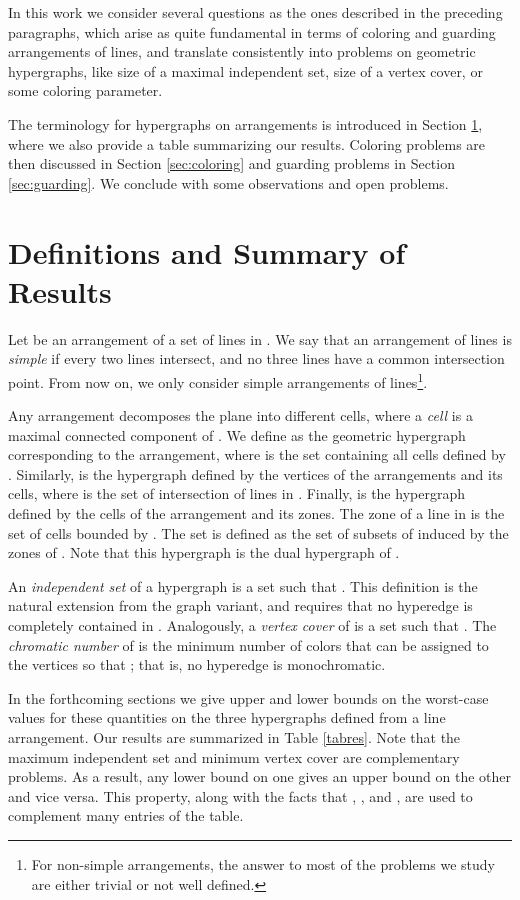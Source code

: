 \documentclass[11pt,a4paper]{article}
\begin{document}
In this work we consider several questions as the ones described in the preceding paragraphs, which arise as quite fundamental in terms of coloring and guarding arrangements of lines, and translate consistently into problems on geometric hypergraphs,  like size of a maximal independent set, size of a vertex cover, or some coloring parameter.

The terminology for hypergraphs on arrangements is introduced in Section \ref{sec:definitions}, where we also provide a table summarizing our results. Coloring problems are then discussed in Section \ref{sec:coloring} and guarding problems in Section \ref{sec:guarding}. We conclude with some observations and open problems.

\section{Definitions and Summary of Results}\label{sec:definitions}
Let  be an arrangement of a set of lines  in . We say that an arrangement of lines  is {\em simple} if every two lines intersect, and no three lines have a common intersection point. From now on, we only consider simple arrangements of lines\footnote{For non-simple arrangements, the answer to most of the problems we study are either trivial or not well defined.}. 

Any arrangement  decomposes the plane into different cells, where a {\em cell} is a maximal connected component of . We define  as the geometric hypergraph corresponding to the arrangement, where  is the set containing all cells defined by . Similarly,  is the hypergraph defined by the vertices of the arrangements and its cells, where  is the set of intersection of lines in . Finally,  is the hypergraph defined by the cells of the arrangement and its zones. The zone of a line  in  is the set of cells bounded by . The set  is defined as the set of subsets of  induced by the zones of . Note that this hypergraph is the dual hypergraph of .

An \emph{independent set} of a hypergraph  is a set  such that . This definition is the natural extension from the graph variant, and requires that no hyperedge is completely contained in . Analogously, a \emph{vertex cover} of  is a set  such that . The \emph{chromatic number}  of  is the minimum number of colors that can be assigned to the vertices  so that ; that is, no hyperedge is monochromatic.

In the forthcoming sections we give upper and lower bounds on the worst-case values for these quantities on the three hypergraphs defined from a line arrangement. Our results are summarized in Table \ref{tabres}. Note that the maximum independent set and minimum vertex cover are complementary problems. As a result, any lower bound on one gives an upper bound on the other and vice versa. This property, along with the facts that , , and , are used to complement many entries of the table. 
\end{document}
